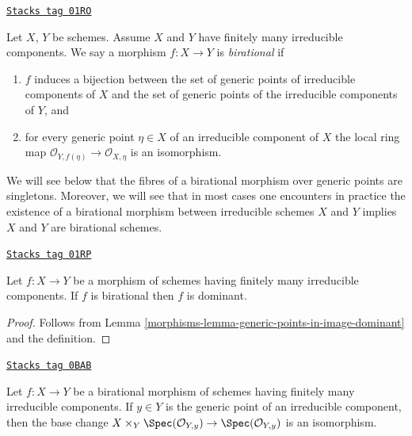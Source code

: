 \begin{definition}[Birational]
\label{morphisms-definition-birational}
\href{https://stacks.math.columbia.edu/tag/01RO}{\texttt{Stacks tag 01RO}}

\begin{reference}
\cite[(2.2.9)]{EGA1}
\end{reference}
Let $X$, $Y$ be schemes. Assume $X$ and $Y$ have finitely many
irreducible components. We say a morphism $f : X \to Y$ is
{\it birational} if
\begin{enumerate}
\item $f$ induces a bijection between the set of generic points
of irreducible components of $X$ and the set of generic points
of the irreducible components of $Y$, and
\item for every generic point $\eta \in X$ of an irreducible component
of $X$ the local ring map
$\mathcal{O}_{Y, f(\eta)} \to \mathcal{O}_{X, \eta}$
is an isomorphism.
\end{enumerate}
\end{definition}

We will see below that the fibres of a birational morphism
over generic points are singletons. Moreover, we will see that
in most cases one encounters in practice the existence of a birational morphism
between irreducible schemes $X$ and $Y$ implies
$X$ and $Y$ are birational schemes.

\begin{lemma}
\label{morphisms-lemma-birational-dominant}
\href{https://stacks.math.columbia.edu/tag/01RP}{\texttt{Stacks tag 01RP}}

Let $f : X \to Y$ be a morphism of schemes having finitely
many irreducible components. If $f$ is birational then
$f$ is dominant.
\end{lemma}

\begin{proof}

Follows from Lemma \ref{morphisms-lemma-generic-points-in-image-dominant}
and the definition.
\end{proof}

\begin{lemma}
\label{morphisms-lemma-birational-generic-fibres}
\href{https://stacks.math.columbia.edu/tag/0BAB}{\texttt{Stacks tag 0BAB}}

Let $f : X \to Y$ be a birational morphism of schemes having finitely
many irreducible components. If $y \in Y$ is the generic point of
an irreducible component, then the base change
$X \times_Y \Spec(\mathcal{O}_{Y, y}) \to \Spec(\mathcal{O}_{Y, y})$
is an isomorphism.
\end{lemma}


